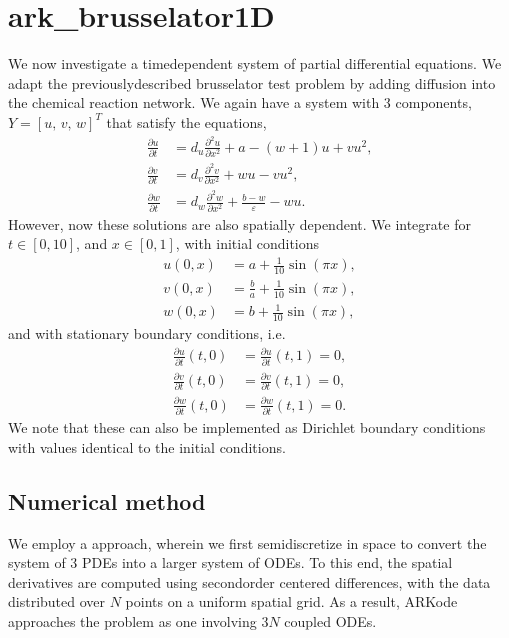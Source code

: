 \documentclass[letterpaper,10pt,english]{sphinxmanual}
\begin{document}
\section{ark\_brusselator1D}
\label{\detokenize{c_serial:ark-brusselator1d}}\label{\detokenize{c_serial:id18}}
\sphinxAtStartPar
We now investigate a time\sphinxhyphen{}dependent system of partial differential
equations.  We adapt the previously\sphinxhyphen{}described brusselator test problem
by adding diffusion into the chemical reaction network.  We again have
a system with 3 components, \(Y = [u,\, v,\, w]^T\) that satisfy
the equations,
\begin{equation*}
\begin{split}\frac{\partial u}{\partial t} &= d_u \frac{\partial^2 u}{\partial
   x^2} + a - (w+1) u + v u^2, \\
\frac{\partial v}{\partial t} &= d_v \frac{\partial^2 v}{\partial
   x^2} + w u - v u^2, \\
\frac{\partial w}{\partial t} &= d_w \frac{\partial^2 w}{\partial
   x^2} + \frac{b-w}{\varepsilon} - w u.\end{split}
\end{equation*}
\sphinxAtStartPar
However, now these solutions are also spatially dependent.  We
integrate for \(t \in [0, 10]\), and \(x \in [0, 1]\), with
initial conditions
\begin{equation*}
\begin{split}u(0,x) &=  a + \frac{1}{10} \sin(\pi x),\\
v(0,x) &= \frac{b}{a} + \frac{1}{10}\sin(\pi x),\\
w(0,x) &=  b + \frac{1}{10}\sin(\pi x),\end{split}
\end{equation*}
\sphinxAtStartPar
and with stationary boundary conditions, i.e.
\begin{equation*}
\begin{split}\frac{\partial u}{\partial t}(t,0) &= \frac{\partial u}{\partial t}(t,1) = 0,\\
\frac{\partial v}{\partial t}(t,0) &= \frac{\partial v}{\partial t}(t,1) = 0,\\
\frac{\partial w}{\partial t}(t,0) &= \frac{\partial w}{\partial t}(t,1) = 0.\end{split}
\end{equation*}
\sphinxAtStartPar
We note that these can also be implemented as Dirichlet boundary
conditions with values identical to the initial conditions.


\subsection{Numerical method}
\label{\detokenize{c_serial:id19}}
\sphinxAtStartPar
We employ a  approach, wherein we first
semi\sphinxhyphen{}discretize in space to convert the system of 3 PDEs into a larger
system of ODEs.  To this end, the spatial derivatives are computed
using second\sphinxhyphen{}order centered differences, with the data distributed
over \(N\) points on a uniform spatial grid.  As a result, ARKode
approaches the problem as one involving \(3N\) coupled ODEs.
\end{document}
